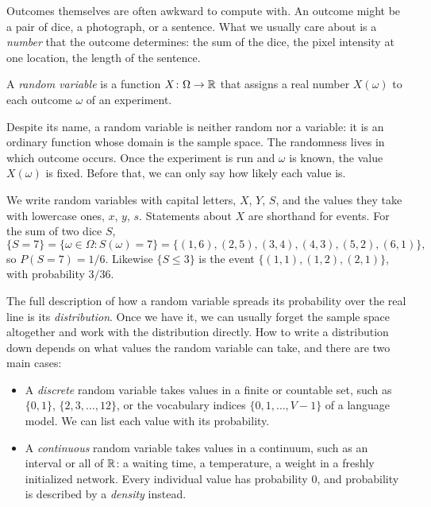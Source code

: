Outcomes themselves are often awkward to compute with. An outcome might
be a pair of dice, a photograph, or a sentence. What we usually care
about is a \emph{number} that the outcome determines: the sum of the
dice, the pixel intensity at one location, the length of the sentence.

\begin{definition}
  \label{def:random-variable}
  A \emph{random variable} is a function $X\colon \Omega \to \mathbb{R}$ that
  assigns a real number $X(\omega)$ to each outcome $\omega$ of an
  experiment.
\end{definition}

Despite its name, a random variable is neither random nor a variable: it
is an ordinary function whose domain is the sample space. The randomness lives in which outcome
occurs. Once the experiment is run and $\omega$ is known, the value
$X(\omega)$ is fixed. Before that, we can only say how likely each value
is.

We write random variables with capital letters, $X$, $Y$, $S$, and the
values they take with lowercase ones, $x$, $y$, $s$. Statements about
$X$ are shorthand for events. For the sum of two dice $S$,
\[
  \{S = 7\} = \{\omega \in \Omega : S(\omega) = 7\}
  = \{(1, 6), (2, 5), (3, 4), (4, 3), (5, 2), (6, 1)\},
\]
so $P(S = 7) = 1/6$. Likewise $\{S \le 3\}$ is the event
$\{(1, 1), (1, 2), (2, 1)\}$, with probability $3/36$.

The full description of how a random variable spreads its probability
over the real line is its \emph{distribution}. Once we have it, we can
usually forget the sample space altogether and work with the
distribution directly. How to write a distribution down depends on what
values the random variable can take, and there are two main cases:
\begin{itemize}
  \item A \emph{discrete} random variable takes values in a finite or
    countable set, such as $\{0, 1\}$, $\{2, 3, \dots, 12\}$, or the
    vocabulary indices $\{0, 1, \dots, V - 1\}$ of a language model. We
    can list each value with its probability.
  \item A \emph{continuous} random variable takes values in a continuum,
    such as an interval or all of $\mathbb{R}$: a waiting time, a temperature, a
    weight in a freshly initialized network. Every individual value has
    probability $0$, and probability is described by a \emph{density}
    instead.
\end{itemize}

